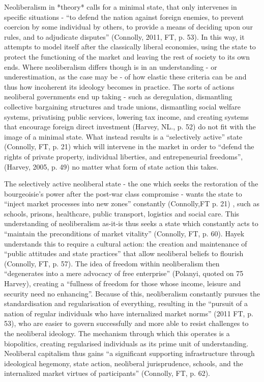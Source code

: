 Neoliberalism in *theory* calls for a minimal state, that only
intervenes in specific situations - ``to defend the nation against
foreign enemies, to prevent coercion by some individual by others, to
provide a means of deciding upon our rules, and to adjudicate disputes''
(Connolly, 2011, FT, p. 53). In this way, it attempts to model itself
after the classically liberal economies, using the state to protect the
functioning of the market and leaving the rest of society to its own
ends. Where neoliberalism differs though is in an understanding - or
underestimation, as the case may be - of how elastic these criteria can
be and thus how incoherent its ideology becomes in practice. The sorts
of actions neoliberal governments end up taking - such as deregulation,
dismantling collective bargaining structures and trade unions,
dismantling social welfare systems, privatising public services,
lowering tax income, and creating systems that encourage foreign direct
investment (Harvey, NL., p. 52) do not fit with the image of a minimal
state. What instead results is a ``selectively active'' state (Connolly,
FT, p. 21) which will intervene in the market in order to ``defend the
rights of private property, individual liberties, and entrepeneurial
freedoms'', (Harvey, 2005, p. 49) no matter what form of state action
this takes.

The selectively active neoliberal state - the one which seeks the
restoration of the bourgeoisie's power after the post-war class
compromise - wants the state to ``inject market processes into new
zones'' constantly (Connolly,FT p. 21) , such as schools, prisons,
healthcare, public transport, logistics and social care. This
understanding of neoliberalism as-it-is thus seeks a state which
constantly acts to ``maintain the preconditions of market vitality''
(Connolly, FT, p. 60). Hayek understands this to require a cultural
action: the creation and maintenance of ``public attitudes and state
practices'' that allow neoliberal beliefs to flourish (Connolly, FT, p.
57). The idea of freedom within neoliberalism then ``degenerates into a
mere advocacy of free enterprise'' (Polanyi, quoted on 75 Harvey),
creating a ``fullness of freedom for those whose income, leisure and
security need no enhancing''. Because of this, neoliberalism constantly
pursues the standardisation and regularisation of everything, resulting
in the ``pursuit of a nation of regular individuals who have
internalized market norms'' (2011 FT, p. 53), who are easier to govern
successfully and more able to resist challenges to the neoliberal
ideology. The mechanism through which this operates is a biopolitics,
creating regularised individuals as its prime unit of understanding.
Neoliberal capitalism thus gains ``a significant supporting
infrastructure through ideological hegemony, state action, neoliberal
jurisprudence, schools, and the internalized market virtues of
participants'' (Connolly, FT, p. 62).

